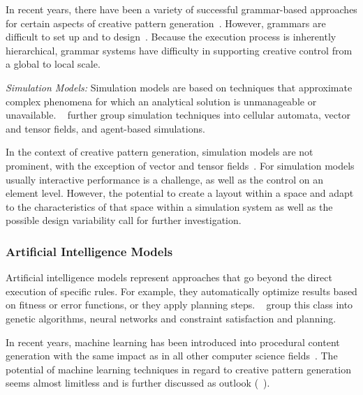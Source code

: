 In recent years, there have been a variety of successful grammar-based approaches for certain aspects of creative pattern generation~\cite{benes_2011_gpm,talton_2011_mpm,ritchie_2015_cpm}. However, grammars are difficult to set up and to design~\cite{stava_2010_ipm}. Because the execution process is inherently hierarchical, grammar systems have difficulty in supporting creative control from a global to local scale.

\textit{Simulation Models:} Simulation models are based on techniques that approximate complex phenomena for which an analytical solution is unmanageable or unavailable. \citeauthor*{hendrikx_2013_pcg}~\cite{hendrikx_2013_pcg} further group simulation techniques into cellular automata, vector and tensor fields, and agent-based simulations. 

In the context of creative pattern generation, simulation models are not prominent, with the exception of vector and tensor fields~\cite{ijiri_2008_aeb,yuanyuan_2011_gso,saputra_2017_ffo}. For simulation models usually interactive performance is a challenge, as well as the control on an element level. However, the potential to create a layout within a space and adapt to the characteristics of that space within a simulation system as well as the possible design variability call for further investigation.


\subsubsection{Artificial Intelligence Models}

Artificial intelligence models represent approaches that go beyond the direct execution of specific rules. For example, they automatically optimize results based on fitness or error functions, or they apply planning steps. \citeauthor*{hendrikx_2013_pcg}~\cite{hendrikx_2013_pcg} group this class into genetic algorithms, neural networks and constraint satisfaction and planning. 

In recent years, machine learning has been introduced into procedural content generation with the same impact as in all other computer science fields~\cite{summerville_2017_pcg}. The potential of machine learning techniques in regard to creative pattern generation seems almost limitless and is further discussed as outlook (~).



